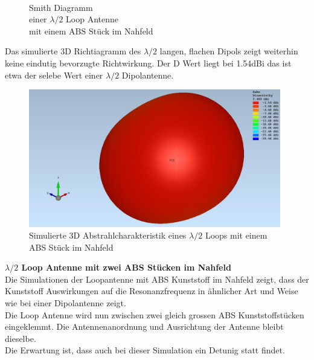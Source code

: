 \begin{figure}[!h]
\begin{center}
  \caption{\\Smith Diagramm \\einer $\lambda/2$ Loop Antenne \\ mit einem ABS Stück im Nahfeld}\label{fig:Smith_Lambda2_Loop_1ABS_4}
\endminipage
\end{center}
\end{figure}
Das simulierte 3D Richtiagramm des $\lambda/2$ langen, flachen Dipols zeigt weiterhin keine eindutig bevorzugte Richtwirkung. Der D Wert liegt bei 1.54dBi das ist etwa der selebe Wert einer $\lambda/2$ Dipolantenne. 
\begin{figure}[h]
	\centering
	\includegraphics[width=11cm]{content/bilder/Evaluation/Loop/L2/1ABS/EM_Far_Field_Loop_Lambda2_mitABS.JPG}%
	\caption{Simulierte 3D Abstrahlcharakteristik eines $\lambda/2$ Loops mit einem ABS Stück im Nahfeld}
	\label{fig:sim_Loop_freiraum_3D_1ABS}
\end{figure}
\newpage
\textbf{$\lambda/2$ Loop Antenne mit zwei ABS Stücken im Nahfeld}\\
Die Simulationen der Loopantenne mit ABS Kunststoff im Nahfeld  zeigt, dass der Kunststoff  Auswirkungen auf die Resonanzfrequenz in ähnlicher Art und Weise wie bei einer Dipolantenne zeigt.\\

Die Loop Antenne wird nun zwischen zwei gleich grossen ABS Kunststoffstücken eingeklemmt. Die Antennenanordnung und Ausrichtung der Antenne bleibt dieselbe. \\
Die Erwartung ist, dass auch bei dieser Simulation ein Detunig statt findet.\\ 

